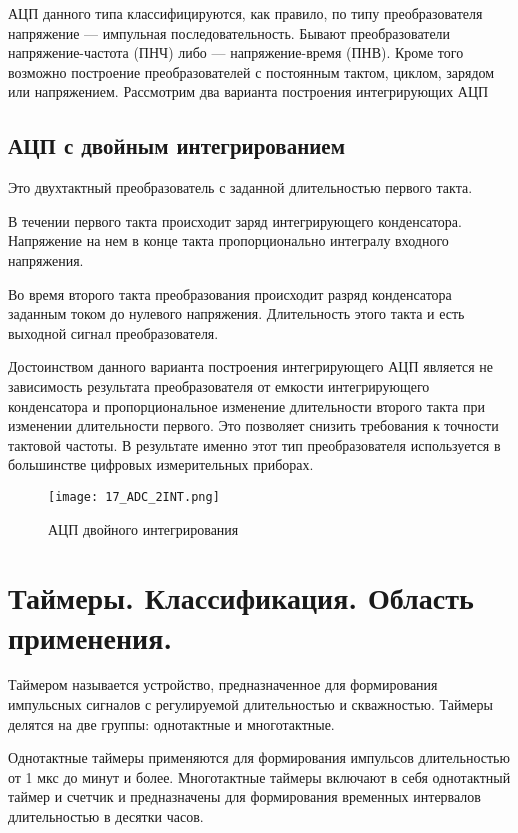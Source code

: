 АЦП данного типа классифицируются, как правило, по типу преобразователя напряжение --- импульная последовательность. Бывают преобразователи напряжение-частота (ПНЧ) либо --- напряжение-время (ПНВ). Кроме того возможно построение преобразователей с постоянным тактом, циклом, зарядом или напряжением. Рассмотрим два варианта построения интегрирующих АЦП

\subsection*{АЦП с двойным интегрированием}

Это двухтактный преобразователь с заданной длительностью первого такта.

В течении первого такта происходит заряд интегрирующего конденсатора. Напряжение на нем в конце такта пропорционально интегралу входного напряжения.

Во время второго такта преобразования происходит разряд конденсатора заданным током до нулевого напряжения. Длительность этого такта и есть выходной сигнал преобразователя.

Достоинством данного варианта построения интегрирующего АЦП является не зависимость результата преобразователя от емкости интегрирующего конденсатора и пропорциональное изменение длительности второго такта при изменении длительности первого. Это позволяет снизить требования к точности тактовой частоты. В результате именно этот тип преобразователя используется в большинстве цифровых измерительных приборах.

\begin{figure}[H]
\centering
\texttt{[image: 17\_ADC\_2INT.png]}
\caption{АЦП двойного интегрирования}
\label{fig:17_ADC_2INT}
\end{figure}


\section{Таймеры. Классификация. Область применения.}

Таймером называется устройство, предназначенное для формирования импульсных сигналов с регулируемой длительностью и скважностью. Таймеры делятся на две группы: однотактные и многотактные.

Однотактные таймеры применяются для формирования импульсов длительностью от 1 мкс до минут  и более. Многотактные таймеры включают в себя однотактный таймер и счетчик и предназначены для формирования временных интервалов длительностью в десятки часов.

